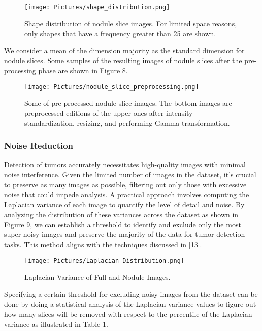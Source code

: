 \documentclass[a4paper, twocolumn, 11pt]{article}
\begin{document}
\begin{figure}[h!]
    \centering
    \texttt{[image: Pictures/shape\_distribution.png]}
    \caption{Shape distribution of nodule slice images. For limited space reasons, only shapes that have a frequency greater than 25 are shown.}
    \label{fig:Figure 7}
\end{figure}

We consider a mean of the dimension majority as the standard dimension for nodule slices. Some samples of the resulting images of nodule slices after the pre-processing phase are shown in Figure 8.  
\vspace{6pt}

\begin{figure}[h!]
    \centering
    \texttt{[image: Pictures/nodule\_slice\_preprocessing.png]}
    \caption{Some of pre-processed nodule slice images. The bottom images are preprocessed editions of the upper ones after intensity standardization, resizing, and performing Gamma transformation.}
    \label{fig:Figure 8}
\end{figure}

\subsubsection{Noise Reduction} 
Detection of tumors accurately necessitates high-quality images with minimal noise interference. Given the limited number of images in the dataset, it's crucial to preserve as many images as possible, filtering out only those with excessive noise that could impede analysis. A practical approach involves computing the Laplacian variance of each image to quantify the level of detail and noise. By analyzing the distribution of these variances across the dataset as shown in Figure 9, we can establish a threshold to identify and exclude only the most super-noisy images and preserve the majority of the data for tumor detection tasks. This method aligns with the techniques discussed in [13].

\begin{figure}[h!]
    \centering
    \texttt{[image: Pictures/Laplacian\_Distribution.png]}
    \caption{Laplacian Variance of Full and Nodule Images.}
    \label{fig:Figure 9}
\end{figure}

Specifying a certain threshold for excluding noisy images from the dataset can be done by doing a statistical analysis of the Laplacian variance values to figure out how many slices will be removed with respect to the percentile of the Laplacian variance as illustrated in Table 1.
\end{document}
